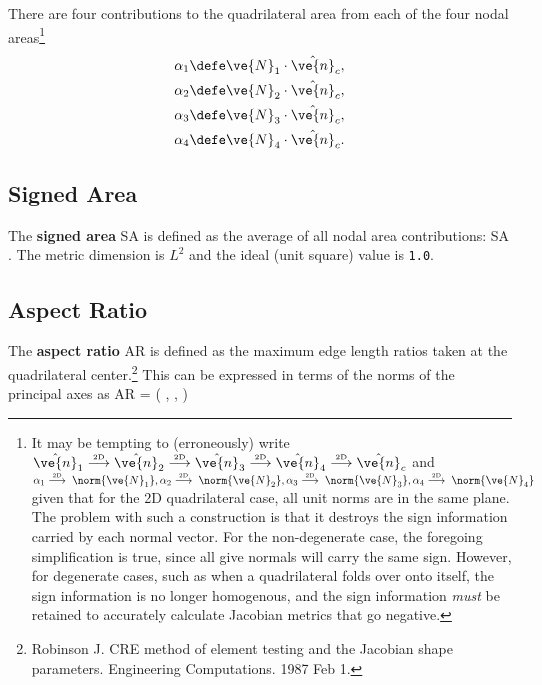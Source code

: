 \documentclass[14pt,letterpaper,fleqn]{extreport}
\begin{document}
There are four contributions to the quadrilateral area from each of the four nodal areas\footnote{\label{footnote:admonishment} It may be tempting to (erroneously) write
 $\hat{\ve{n}}_1 
 \overset{\tiny \mbox{2D}}{\longrightarrow}
 \hat{\ve{n}}_2 
 \overset{\tiny \mbox{2D}}{\longrightarrow}
 \hat{\ve{n}}_3 
 \overset{\tiny \mbox{2D}}{\longrightarrow}
 \hat{\ve{n}}_4
 \overset{\tiny \mbox{2D}}{\longrightarrow}
 \hat{\ve{n}}_c$
and
 $\alpha_1  \overset{\tiny \mbox{2D}}{\longrightarrow} \; \norm{\ve{N}_1}, 
 \alpha_2  \overset{\tiny \mbox{2D}}{\longrightarrow} \; \norm{\ve{N}_2},
 \alpha_3  \overset{\tiny \mbox{2D}}{\longrightarrow} \; \norm{\ve{N}_3},
 \alpha_4  \overset{\tiny \mbox{2D}}{\longrightarrow} \; \norm{\ve{N}_4}$
 given that for the 2D quadrilateral case, all unit norms are in the same plane.
 The problem with such a construction is that it destroys the sign information 
 carried by each normal vector.  
 For the non-degenerate case, the foregoing simplification is true, since all give normals
 will carry the same sign.  However, for degenerate cases, such as when a quadrilateral
 folds over onto itself, 
 the sign information is no longer homogenous, and the sign information
 {\em must} be retained to accurately calculate Jacobian metrics that go negative.
}
\begin{align}
 \alpha_1 & \defe \ve{N}_1 \cdot \hat{\ve{n}}_c, \\
 \alpha_2 & \defe \ve{N}_2 \cdot \hat{\ve{n}}_c, \\
 \alpha_3 & \defe \ve{N}_3 \cdot \hat{\ve{n}}_c, \\
 \alpha_4 & \defe \ve{N}_4 \cdot \hat{\ve{n}}_c.
\end{align}
%

\subsection{Signed Area}
The {\bf signed area} SA is defined as the average of all nodal area contributions:
\be 
\mbox{SA}  \; .
\ee
The metric dimension is $L^2$ and the ideal (unit square) value is {\tt 1.0}.

\subsection{Aspect Ratio}

The {\bf aspect ratio} AR is defined as the maximum edge length ratios taken at the 
quadrilateral center.\footnote{Robinson J. CRE method 
of element testing and the Jacobian shape parameters. Engineering Computations. 
1987 Feb 1.}  
This can be expressed in terms of the norms of the principal axes as
\be 
\mbox{AR} = \max\left(
  \frac{\norm{\vX}}{\norm{\vY}}, 
  \frac{\norm{\vY}}{\norm{\vX}}, 
 \right)
\ee
\end{document}
